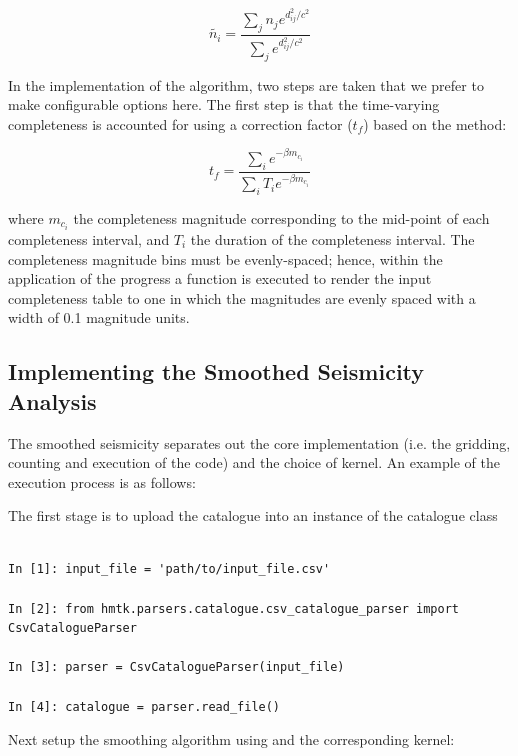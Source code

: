 \begin{equation}
\tilde{n_i} = \frac{\sum_j n_j e^{d_{ij}^2 / c^2}}{\sum_j e^{d_{ij}^2 / c^2}} 
\end{equation}

In the implementation of the algorithm, two steps are taken that we prefer to make configurable options here. The first step is that the time-varying completeness is accounted for using a correction factor ($t_f$) based on the \cite{Weichert1980} method:

 \begin{equation}
 t_f = \frac{\sum_i e^{-\beta m_{c_i}}}{\sum_i T_i e^{-\beta m_{c_i}}} 
 \end{equation}
 
where $m_{c_i}$ the completeness magnitude corresponding to the mid-point of each completeness interval, and $T_i$ the duration of the completeness interval. The completeness magnitude bins must be evenly-spaced; hence, within the application of the progress a function is executed to render the input completeness table to one in which the magnitudes are evenly spaced with a width of 0.1 magnitude units. 

\subsection{Implementing the Smoothed Seismicity Analysis}

The smoothed seismicity separates out the core implementation (i.e. the gridding, counting and execution of the code) and the choice of kernel. An example of the execution process is as follows:

The first stage is to upload the catalogue into an instance of the catalogue class

\begin{Verbatim}[frame=single, commandchars=\\\{\}, fontsize=\scriptsize]

In [1]: input_file = 'path/to/input_file.csv'

In [2]: from hmtk.parsers.catalogue.csv_catalogue_parser import CsvCatalogueParser

In [3]: parser = CsvCatalogueParser(input_file)

In [4]: catalogue = parser.read_file()

\end{Verbatim}

Next setup the smoothing algorithm using and the corresponding kernel:

